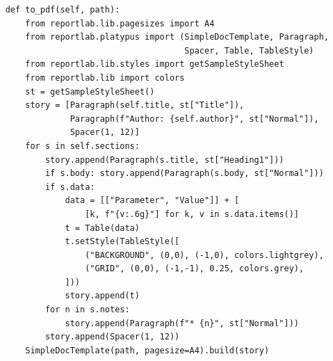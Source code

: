 \documentclass[10pt,a4paper,openany]{book}
\begin{document}
\begin{lstlisting}
    def to_pdf(self, path):
        from reportlab.lib.pagesizes import A4
        from reportlab.platypus import (SimpleDocTemplate, Paragraph,
                                        Spacer, Table, TableStyle)
        from reportlab.lib.styles import getSampleStyleSheet
        from reportlab.lib import colors
        st = getSampleStyleSheet()
        story = [Paragraph(self.title, st["Title"]),
                 Paragraph(f"Author: {self.author}", st["Normal"]),
                 Spacer(1, 12)]
        for s in self.sections:
            story.append(Paragraph(s.title, st["Heading1"]))
            if s.body: story.append(Paragraph(s.body, st["Normal"]))
            if s.data:
                data = [["Parameter", "Value"]] + [
                    [k, f"{v:.6g}"] for k, v in s.data.items()]
                t = Table(data)
                t.setStyle(TableStyle([
                    ("BACKGROUND", (0,0), (-1,0), colors.lightgrey),
                    ("GRID", (0,0), (-1,-1), 0.25, colors.grey),
                ]))
                story.append(t)
            for n in s.notes:
                story.append(Paragraph(f"* {n}", st["Normal"]))
            story.append(Spacer(1, 12))
        SimpleDocTemplate(path, pagesize=A4).build(story)
\end{lstlisting}
\end{document}

